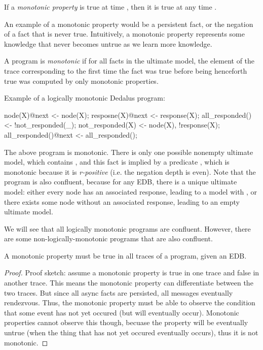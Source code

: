 \begin{definition}
If a {\em monotonic property} is true at time , then it is true at any time .
\end{definition}

An example of a monotonic property would be a persistent fact, or the negation of a fact that is never true.  Intuitively, a monotonic property represents some knowledge that never becomes untrue as we learn more knowledge.

\begin{definition}
A \lang program is {\em monotonic} if for all facts in the ultimate model, the element of the trace corresponding to the first time the fact was true before being henceforth true was computed by only monotonic properties. 
\end{definition}

\begin{example}
Example of a logically monotonic Dedalus program:\\
\begin{Dedalus}
node(X)@next <- node(X);
resposne(X)@next <- response(X);
all_responded() <- !not_responded(_);
not_responded(X) <- node(X), !response(X);
all_responded()@next <- all_responded();
\end{Dedalus}
\end{example}

The above program is monotonic. There is only one possible nonempty ultimate model, which contains , and this fact is implied by a predicate , which is monotonic because it is {\em r-positive}  (i.e. the negation depth is even).  Note that the program is also confluent, because for any EDB, there is a unique ultimate model: either every node has an associated response, leading to a model with , or there exists some node without an associated response, leading to an empty ultimate model.

We will see that all logically monotonic programs are confluent.  However, there are some non-logically-monotonic programs that are also confluent.

\begin{lemma}
A monotonic property must be true in all traces of a program, given an EDB.
\end{lemma}
\begin{proof}
Proof sketch: assume a monotonic property is true in one trace and false in another trace.  This means the monotonic property can differentiate between the two traces.  But since all async facts are persisted, all messages eventually rendezvous.  Thus, the monotonic property must be able to observe the condition that some event has not yet occured (but will eventually occur).  Monotonic properties cannot observe this though, becuase the property will be eventually untrue (when the thing that has not yet occured eventually occurs), thus it is not monotonic.
\end{proof}

